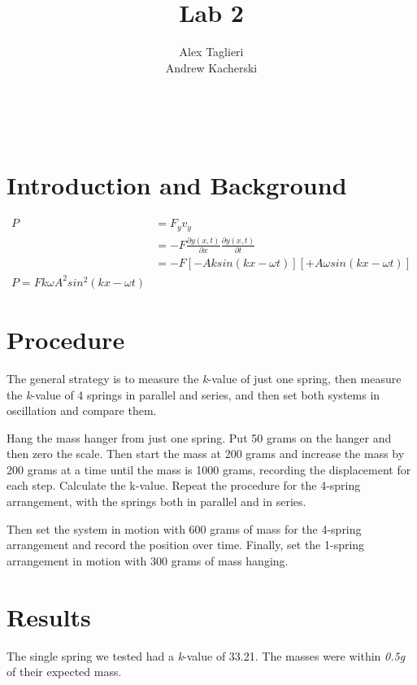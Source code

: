 \documentclass[]{article}
\title{Lab 2}
\author{
	Alex Taglieri
	\\
	Andrew Kacherski
}
\begin{document}
	\maketitle
	\newpage
	\
	\raggedright
	
	
	\section{Introduction and Background}
	
	
	
	\begin{equation}\label{parallelInSeries2}
	\begin{split}
	P&=F_y v_y\\
	&=-F \frac{\partial y(x,t)}{\partial x} \frac{\partial y(x,t)}{\partial t}\\
	&=-F [-A k sin(kx - \omega t)] [+A \omega sin(kx - \omega t)]\\
	P=Fk \omega A^2 sin^2(kx- \omega t)
	\end{split}
	\end{equation}
	
	
	
	
	\section{Procedure}
	
	The general strategy is to measure the \textit{k}-value of just one spring, then measure the \textit{k}-value of 4 springs in parallel and series, and then set both systems in oscillation and compare them.
	
	Hang the mass hanger from just one spring. Put 50 grams on the hanger and then zero the scale. Then start the mass at 200 grams and increase the mass by 200 grams at a time until the mass is 1000 grams, recording the displacement for each step. Calculate the k-value. 
	Repeat the procedure for the 4-spring arrangement, with the springs both in parallel and in series.
	
	Then set the system in motion with 600 grams of mass for the 4-spring arrangement and record the position over time. Finally, set the 1-spring arrangement in motion with 300 grams of mass hanging.
	
	
	\section{Results}
	
	The single spring we tested had a \textit{k}-value of 33.21. The masses were within \textit{0.5g} of their expected mass.
	
\end{document}
